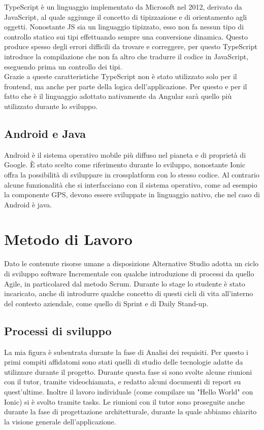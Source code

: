 TypeScript è un linguaggio implementato da Microsoft nel 2012, derivato da JavaScript, al quale aggiunge il concetto di tipizzazione e di orientamento agli oggetti. Nonostante JS sia un linguaggio \gls{tipizzato}, esso non fa nessun tipo di controllo statico sui tipi effettuando sempre una conversione dinamica. Questo produce spesso degli errori difficili da trovare e correggere, per questo TypeScript introduce la compilazione che non fa altro che tradurre il codice in JavaScript, eseguendo prima un controllo dei tipi.\\
Grazie a queste caratteristiche TypeScript non è stato utilizzato solo per il \gls{frontend}, ma anche per parte della logica
dell'applicazione. Per questo e per il fatto che è il linguaggio adottato nativamente da Angular sarà quello più utilizzato durante lo
sviluppo.

\subsection{Android e Java}

\gls{Android} è il sistema operativo mobile più diffuso nel pianeta e di proprietà di \gls{Google}. È stato scelto come riferimento durante
lo sviluppo, nonostante Ionic offra la possibilità di sviluppare in crossplatform con lo stesso codice. Al contrario alcune
funzionalità che si interfacciano con il sistema operativo, come ad esempio la componente GPS, devono essere sviluppate in linguaggio
nativo, che nel caso di \gls{Android} è \gls{java}.


\section{Metodo di Lavoro}
Dato le contenute risorse umane a disposizione Alternative Studio adotta un ciclo di sviluppo software \gls{Incrementale} con qualche
introduzione di processi da quello \gls{Agile}, in particolared dal metodo \gls{Scrum}. Durante lo stage lo studente è stato incaricato,
anche di introdurre qualche concetto di questi cicli di vita all'interno del contesto aziendale, come quello di \gls{Sprint} e di \gls{Daily Stand-up}.

\subsection{Processi di sviluppo}
La mia figura è subentrata durante la fase di Analisi dei requisiti. Per questo i primi compiti affidatomi sono stati quelli di studio delle
tecnologie adatte da utilizzare durante il progetto. Durante questa fase si sono svolte alcune riunioni con il tutor, tramite videochiamata,
e redatto alcuni documenti di report su quest'ultime. Inoltre il lavoro individuale (come compilare un "Hello World" con Ionic) si è svolto
tramite tasks. Le riunioni con il tutor sono proseguite anche durante la fase di progettazione architetturale, durante la quale abbiamo
chiarito la visione generale dell'applicazione.

